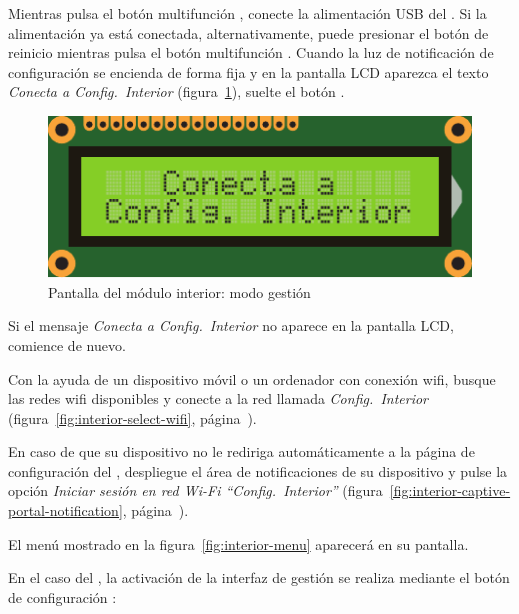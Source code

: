 \begin{enumeratecompact}

\item Mientras pulsa el botón multifunción , conecte la alimentación USB  del \MI. Si la alimentación ya está conectada, alternativamente, puede presionar el botón de reinicio  mientras pulsa el botón multifunción . Cuando la luz de notificación de configuración  se encienda de forma fija y en la pantalla LCD  aparezca el texto \emph{Conecta a Config.~Interior} (figura~\ref{fig:screen-config}), suelte el botón .

\begin{figure}[!b]
  \centering
  \includegraphics[width=0.6\columnwidth]{images/screen-config}
  \caption{Pantalla del módulo interior: modo gestión}
  \label{fig:screen-config}
\end{figure}

Si el mensaje \emph{Conecta a Config.~Interior} no aparece en la pantalla LCD, comience de nuevo.

\item Con la ayuda de un dispositivo móvil o un ordenador con conexión wifi, busque las redes wifi disponibles y conecte a la red llamada \emph{Config.~Interior} (figura~\ref{fig:interior-select-wifi}, página~\pageref{fig:interior-select-wifi}).

\item En caso de que su dispositivo no le rediriga automáticamente a la página de configuración del \MI, despliegue el área de notificaciones de su dispositivo y pulse la opción \emph{Iniciar sesión en red Wi-Fi ``Config.~Interior''} (figura~\ref{fig:interior-captive-portal-notification}, pá\-gi\-na~\pageref{fig:interior-captive-portal-notification}).

\item El menú mostrado en la figura~\ref{fig:interior-menu} aparecerá en su pantalla.

\end{enumeratecompact}

En el caso del \MEE, la activación de la interfaz de gestión se realiza mediante el botón de configuración :

